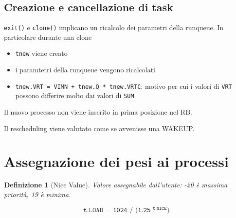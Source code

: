 \documentclass[12pt, a4paper]{report}
\newtheorem{definition}{Definizione}
\begin{document}
\subsection{Creazione e cancellazione di task}
\texttt{exit()} e \texttt{clone()} implicano un ricalcolo dei parametri della
runqueue. In particolare durante una clone
\begin{itemize}
	\item \texttt{tnew} viene creato
	\item i paramtetri della runqueue vengono ricalcolati
	\item \texttt{tnew.VRT = VIMN + tnew.Q * tnew.VRTC}: motivo per cui i valori
		di \texttt{VRT} possono differire molto dai valori di \texttt{SUM}
\end{itemize}
Il nuovo processo non viene inserito in prima posizione nel RB.

Il rescheduling viene valutato come se avvenisse una WAKEUP.

\section{Assegnazione dei pesi ai processi}
\begin{definition}[Nice Value]
	Valore assegnabile dall'utente: -20 è massima priorità, 19 è minima.
\end{definition}
\[
	\texttt{t.LOAD = 1024 / (1.25 $^{\texttt{t.NICE}}$)}
\]
\end{document}
